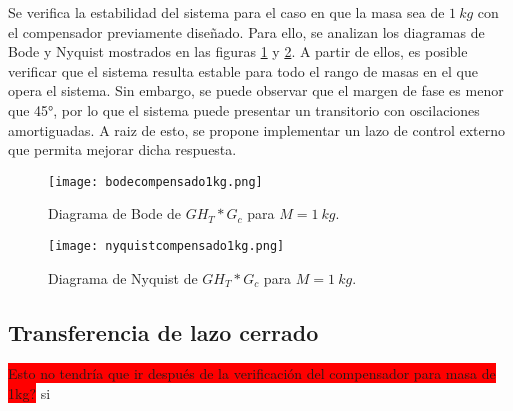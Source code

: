
\noindent Se verifica la estabilidad del sistema  para el caso en que la masa sea de $1\:kg$ con el compensador previamente diseñado. Para ello, se analizan los diagramas de Bode y Nyquist mostrados en las figuras \ref{fig:bode-analog-para-M-1Kg} y \ref{fig:nyquist-analog-para-M-1Kg}. A partir de ellos, es posible verificar que el sistema resulta estable para todo el rango de masas en el que opera el sistema. Sin embargo, se puede observar que el margen de fase es menor que 45°, por lo que el sistema puede presentar un transitorio con oscilaciones amortiguadas. A raiz de esto, se propone implementar un lazo de control externo que permita mejorar dicha respuesta.

\begin{figure}[H]
	\centering
	\texttt{[image: bodecompensado1kg.png]}
	\caption{Diagrama de Bode de $GH_T*G_c$ para $M=1\:kg$.}
	\label{fig:bode-analog-para-M-1Kg}
\end{figure}


\begin{figure}[H]
	\centering
	\texttt{[image: nyquistcompensado1kg.png]}
	\caption{Diagrama de Nyquist de $GH_T*G_c$ para $M=1\:kg$.}
	\label{fig:nyquist-analog-para-M-1Kg}
\end{figure}


\subsection{Transferencia de lazo cerrado}
\colorbox{red}{Esto no tendría que ir después de la verificación del compensador para masa de 1kg?} si


